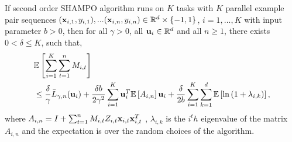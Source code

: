 \begin{theorem}
  If second order SHAMPO algorithm runs on $K$ tasks with $K$ parallel example pair
  sequences
  $(\mathbf{x}_{i,1},y_{i,1}),...(\mathbf{x}_{i,n},y_{i,n})\in\mathbb{R}^d\times\{-1,1\}$,
  $i=1,...,K$ with input parameter $b>0$, then for all $\gamma>0$, all
  $\mathbf{u}_{i}\in\mathbb{R}^d$ and all $n\ge1$, there exists $0<\delta\le K$, such that,
  \begin{equation*}
  \begin{split}
   &\mathbb{E}\left[{\sum_{i=1}^{K}\sum_{t=1}^{n}{M_{i,t}}}\right] \\
   &\le \frac{\delta}{\gamma}{\bar L}_{\gamma,n}(\mathbf{u}_{i})
+ \frac{\delta b}{2\gamma^2}\sum_{i=1}^{K}\mathbf{u}_i^T\mathbb{E}\left[{A_{i,n}}\right]\mathbf{u}_i+ 
\frac{\delta}{2b}\sum_{i=1}^{K}\sum_{k=1}^{d}\mathbb{E}\left[{\ln\left({1+\lambda_{i,k}}\right)}\right],
\end{split}
\end{equation*} 
 where $A_{i,n} = I+\sum_{t=1}^{n}M_{i,t}Z_{i,t}\mathbf{x}_{i,t}\mathbf{x}_{i,t}^T$ , $\lambda_{i,k}$ is the $i^th$ eigenvalue
 of the matrix $A_{i,n}$ and the expectation is over the random choices of the algorithm.
\end{theorem} \label{thm:SO_bound}

